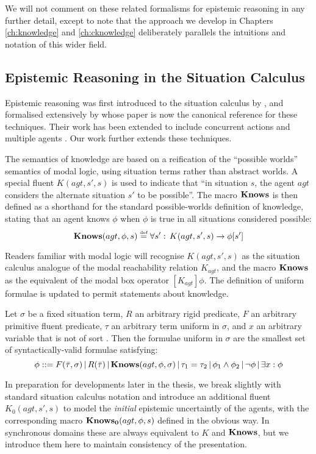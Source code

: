 We will not comment on these related formalisms for epistemic reasoning
in any further detail, except to note that the approach we develop
in Chapters \ref{ch:knowledge} and \ref{ch:cknowledge} deliberately
parallels the intuitions and notation of this wider field.


\subsection{Epistemic Reasoning in the Situation Calculus}

Epistemic reasoning was first introduced to the situation calculus
by \citet{moore80know_act}, and formalised extensively by \citet{scherl03sc_knowledge}
whose paper is now the canonical reference for these techniques. Their
work has been extended to include concurrent actions \citep{scherl03conc_knowledge}
and multiple agents \citep{shapiro98specifying_ma_systems}. Our work
further extends these techniques.

The semantics of knowledge are based on a reification of the {}``possible
worlds'' semantics of modal logic, using situation terms rather than
abstract worlds. A special fluent $K(agt,s',s)$ is used to indicate
that {}``in situation $s$, the agent $agt$ considers the alternate
situation $s'$ to be possible''. The macro $\mathbf{Knows}$ is then defined
as a shorthand for the standard possible-worlds definition of knowledge,
stating that an agent knows $\phi$ when $\phi$ is true in all situations
considered possible: \begin{equation}
\mathbf{Knows}(agt,\phi,s)\stackrel{\mbox{\tiny def}}{=}\forall s':\, K(agt,s',s)\rightarrow\phi[s']\label{eqn:Knowledge:knows_def}\end{equation}


Readers familiar with modal logic will recognise $K(agt,s',s)$ as
the situation calculus analogue of the modal reachability relation
$K_{agt}$, and the macro $\mathbf{Knows}$ as the equivalent of the modal
box operator $[K_{agt}]\phi$. The definition of uniform formulae
is updated to permit statements about knowledge.

\begin{defnL}
 Let $\sigma$ be a fixed
situation term, $R$ an arbitrary rigid predicate, $F$ an arbitrary
primitive fluent predicate, $\tau$ an arbitrary term uniform in $\sigma$,
and $x$ an arbitrary variable that is not of sort .
Then the formulae uniform in $\sigma$ are the smallest set of syntactically-valid
formulae satisfying:\[
\phi::=F(\bar{\tau},\sigma)\,|\, R(\bar{\tau})\,|\,\mathbf{Knows}(agt,\phi,\sigma)\,|\,\tau_{1}=\tau_{2}\,|\,\phi_{1}\wedge\phi_{2}\,|\,\neg\phi\,|\,\exists x:\phi\]

\end{defnL}
In preparation for developments later in the thesis, we break slightly
with standard situation calculus notation and introduce an additional
fluent $K_{0}(agt,s',s)$ to model the \emph{initial} epistemic uncertaintly
of the agents, with the corresponding macro $\mathbf{Knows_{0}}(agt,\phi,s)$
defined in the obvious way. In synchronous domains these are always
equivalent to $K$ and $\mathbf{Knows}$, but we introduce them here to maintain
consistency of the presentation.

